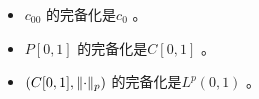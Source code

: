 \begin{example}
    \begin{itemize}
        \item \(c_{00}\) 的完备化是\(c_{0}\) 。
        \item \(P[0,1]\) 的完备化是\(C[0,1]\) 。
        \item \((C[0,1], \lVert\cdot\rVert_{p})\) 的完备化是\(L^{p}(0,1)\) 。
    \end{itemize}
\end{example}